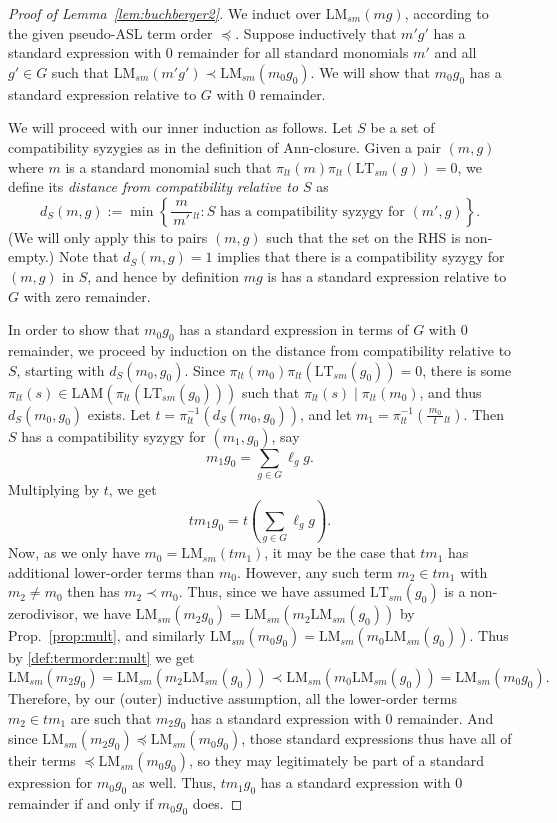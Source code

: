 \documentclass[11pt,reqno]{amsart}
\newcommand{\suchthat}{:}
\newcommand{\ltfrac}[2]{\frac{\,#1\,}{\,#2\,}{}_{{\scriptscriptstyle lt}}}
\newcommand{\divides}{\mid}
\newcommand{\lmsm}{\text{LM}_{sm}}
\newcommand{\ltsm}{\text{LT}_{sm}}
\newcommand{\LAM}{\ensuremath{\text{LAM}}}
\theoremstyle{definition}
\numberwithin{equation}{section}
\begin{document}
\begin{proof}[Proof of Lemma~\ref{lem:buchberger2}]
We induct over $\lmsm(mg)$, according to the given pseudo-ASL term order $\preceq$. Suppose inductively that $m' g'$ has a standard expression with 0 remainder for all standard monomials $m'$ and all $g' \in G$ such that $\lmsm(m' g') \prec \lmsm(m_0 g_0)$. We will show that $m_0 g_0$ has a standard expression relative to $G$ with 0 remainder.

We will proceed with our inner induction as follows. Let $S$ be a set of compatibility syzygies as in the definition of Ann-closure. Given a pair $(m,g)$ where $m$ is a standard monomial such that $\pi_{lt}(m) \pi_{lt}(\ltsm(g)) = 0$, we define its \emph{distance from compatibility relative to $S$} as
\[
d_S(m,g) := \min\left\{\ltfrac{m}{m'} \suchthat S \text{ has a compatibility syzygy for } (m', g)\right\}.
\]
(We will only apply this to pairs $(m,g)$ such that the set on the RHS is non-empty.) Note that $d_S(m,g)=1$ implies that there is a compatibility syzygy for $(m,g)$ in $S$, and hence by definition $mg$ is has a standard expression relative to $G$ with zero remainder.

In order to show that $m_0 g_0$ has a standard expression in terms of $G$ with 0 remainder, we proceed by induction on the distance from compatibility relative to $S$, starting with $d_S(m_0, g_0)$. Since $\pi_{lt}(m_0) \pi_{lt}(\ltsm(g_0)) = 0$, there is some $\pi_{lt}(s) \in \LAM(\pi_{lt}(\ltsm(g_0)))$ such that $\pi_{lt}(s) \divides \pi_{lt}(m_0)$, and thus $d_S(m_0,g_0)$ exists. Let $t = \pi_{lt}^{-1}(d_S(m_0, g_0))$, and let $m_1 = \pi_{lt}^{-1}\left(\ltfrac{m_0}{t}\right)$.
Then $S$ has a compatibility syzygy for $(m_1, g_0)$, say 
\[
m_1 g_0 = \sum_{g \in G} \ell_g g.
\]
Multiplying by $t$, we get
\[
t m_1 g_0 = t\left(\sum_{g \in G} \ell_g g \right).
\]
Now, as we only have $m_0 = \lmsm(t m_1)$, it may be the case that $tm_1$ has additional lower-order terms than $m_0$. However, any such term $m_2 \in t m_1$ with $m_2 \neq m_0$ then has $m_2 \prec m_0$. Thus, since we have assumed $\ltsm(g_0)$ is a non-zerodivisor, 
we have $\lmsm(m_2 g_0) = \lmsm(m_2 \lmsm(g_0))$ by Prop.~\ref{prop:mult}, and similarly $\lmsm(m_0 g_0) = \lmsm(m_0 \lmsm(g_0))$. Thus by \ref{def:termorder:mult} we get 
\[
\lmsm(m_2 g_0)  = \lmsm(m_2 \lmsm(g_0)) \prec \lmsm(m_0 \lmsm(g_0)) = \lmsm(m_0 g_0).
\] 
Therefore, by our (outer) inductive assumption, all the lower-order terms $m_2 \in tm_1$ are such that $m_2 g_0$ has a standard expression with 0 remainder. And since $\lmsm(m_2 g_0) \preceq \lmsm(m_0 g_0)$, those standard expressions thus have all of their terms $\preceq \lmsm(m_0 g_0)$, so they may legitimately be part of a standard expression for $m_0 g_0$ as well. Thus, $tm_1 g_0$ has a standard expression with 0 remainder if and only if $m_0 g_0$ does.


\end{proof}
\end{document}

